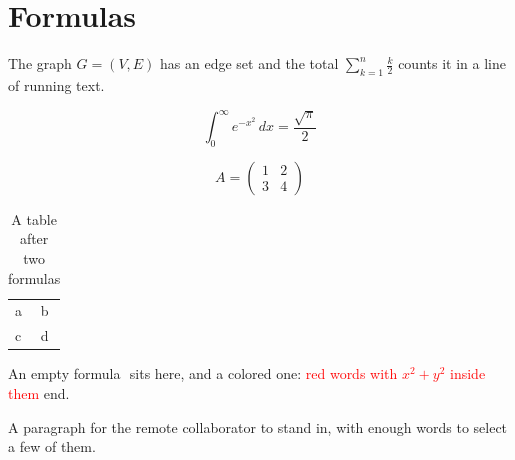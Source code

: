 \documentclass{article}
\begin{document}
\section{Formulas}
The graph $G =\left(  V, E  \right)$ has an edge set and the total $\sum_{k=1}^{n} \frac{k}{2}$ counts it in a line of running text.

\[ \int_{0}^{\infty} e^{-x^2} \, dx = \frac{\sqrt{\pi}}{2} \]

\[ A = \begin{pmatrix} 1 & 2 \\ 3 & 4 \end{pmatrix} \]

\begin{table}[h]
\centering
\begin{tabular}{ll}
a & b \\
c & d
\end{tabular}
\caption{A table after two formulas}
\end{table}

An empty formula $ $ sits here, and a colored one: \textcolor{red}{red words with $x^2 + y^2$ inside them} end.

A paragraph for the remote collaborator to stand in, with enough words to select a few of them.
\end{document}
